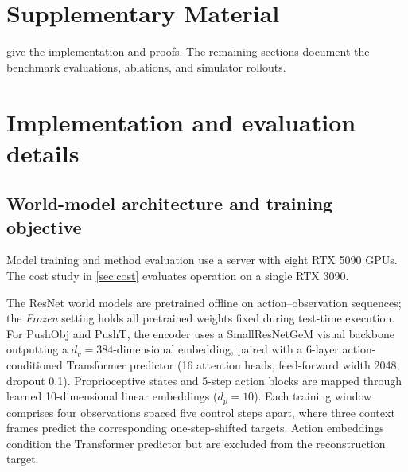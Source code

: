 \section*{Supplementary Material}
 give the implementation and proofs. The remaining sections document the benchmark evaluations, ablations, and simulator rollouts.

\section{Implementation and evaluation details}
\label{sec:implementation}
\subsection{World-model architecture and training objective}
Model training and method evaluation use a server with eight RTX 5090 GPUs. The cost study in \cref{sec:cost} evaluates operation on a single RTX 3090.

The ResNet world models are pretrained offline on action--observation sequences; the \emph{Frozen} setting holds all pretrained weights fixed during test-time execution. For PushObj and PushT, the encoder uses a SmallResNetGeM visual backbone outputting a $d_v=384$-dimensional embedding, paired with a 6-layer action-conditioned Transformer predictor (16 attention heads, feed-forward width 2048, dropout 0.1). Proprioceptive states and 5-step action blocks are mapped through learned 10-dimensional linear embeddings ($d_p=10$). Each training window comprises four observations spaced five control steps apart, where three context frames predict the corresponding one-step-shifted targets. Action embeddings condition the Transformer predictor but are excluded from the reconstruction target.

